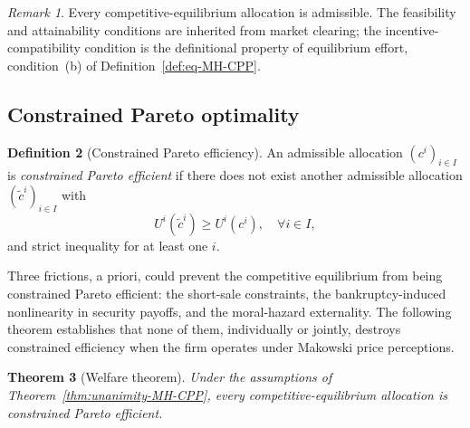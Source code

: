 \documentclass[11pt,a4paper,oneside]{book}
\def\geq{\geqslant}
\theoremstyle{plain}
\newtheorem{theorem}{Theorem}[chapter]
\theoremstyle{definition}
\newtheorem{definition}[theorem]{Definition}
\theoremstyle{remark}
\newtheorem{remark}[theorem]{Remark}
\numberwithin{equation}{chapter}
\begin{document}
\begin{remark}\label{rem:eq-is-admissible-MH-CPP}
Every competitive-equilibrium allocation is admissible.
The feasibility and attainability conditions are inherited from market clearing; the incentive-compatibility condition is the definitional property of equilibrium effort, condition~(b) of Definition~\ref{def:eq-MH-CPP}.
\end{remark}

\subsection{Constrained Pareto optimality}

\begin{definition}[Constrained Pareto efficiency]\label{def:CPO-MH-CPP}
An admissible allocation $(c^i)_{i \in I}$ is \emph{constrained Pareto efficient} if there does not exist another admissible allocation $(\widetilde{c}^i)_{i \in I}$ with
\begin{equation*}
  U^i(\widetilde{c}^i) \geq U^i(c^i), \quad \forall i \in I,
\end{equation*}
and strict inequality for at least one $i$.
\end{definition}

Three frictions, a priori, could prevent the competitive equilibrium from being constrained Pareto efficient: the short-sale constraints, the bankruptcy-induced nonlinearity in security payoffs, and the moral-hazard externality.
The following theorem establishes that none of them, individually or jointly, destroys constrained efficiency when the firm operates under Makowski price perceptions.

\begin{theorem}[Welfare theorem]\label{thm:welfare-MH-CPP}
Under the assumptions of Theorem~\ref{thm:unanimity-MH-CPP}, every competitive-equilibrium allocation is constrained Pareto efficient.
\end{theorem}
\end{document}
